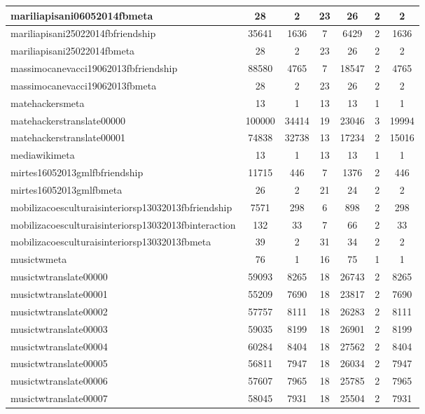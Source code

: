 \begin{table*}[h!]
\begin{center}
\begin{tabular}{| l | c | c | c | c | c | c |}
mariliapisani06052014fbmeta & 28  & 2  & 23  & 26  & 2  & 2 \\\hline
mariliapisani25022014fbfriendship & 35641  & 1636  & 7  & 6429  & 2  & 1636 \\\hline
mariliapisani25022014fbmeta & 28  & 2  & 23  & 26  & 2  & 2 \\\hline
massimocanevacci19062013fbfriendship & 88580  & 4765  & 7  & 18547  & 2  & 4765 \\\hline
massimocanevacci19062013fbmeta & 28  & 2  & 23  & 26  & 2  & 2 \\\hline
matehackersmeta & 13  & 1  & 13  & 13  & 1  & 1 \\\hline
matehackerstranslate00000 & 100000  & 34414  & 19  & 23046  & 3  & 19994 \\\hline
matehackerstranslate00001 & 74838  & 32738  & 13  & 17234  & 2  & 15016 \\\hline
mediawikimeta & 13  & 1  & 13  & 13  & 1  & 1 \\\hline
mirtes16052013gmlfbfriendship & 11715  & 446  & 7  & 1376  & 2  & 446 \\\hline
mirtes16052013gmlfbmeta & 26  & 2  & 21  & 24  & 2  & 2 \\\hline
mobilizacoesculturaisinteriorsp13032013fbfriendship & 7571  & 298  & 6  & 898  & 2  & 298 \\\hline
mobilizacoesculturaisinteriorsp13032013fbinteraction & 132  & 33  & 7  & 66  & 2  & 33 \\\hline
mobilizacoesculturaisinteriorsp13032013fbmeta & 39  & 2  & 31  & 34  & 2  & 2 \\\hline
musictwmeta & 76  & 1  & 16  & 75  & 1  & 1 \\\hline
musictwtranslate00000 & 59093  & 8265  & 18  & 26743  & 2  & 8265 \\\hline
musictwtranslate00001 & 55209  & 7690  & 18  & 23817  & 2  & 7690 \\\hline
musictwtranslate00002 & 57757  & 8111  & 18  & 26283  & 2  & 8111 \\\hline
musictwtranslate00003 & 59035  & 8199  & 18  & 26901  & 2  & 8199 \\\hline
musictwtranslate00004 & 60284  & 8404  & 18  & 27562  & 2  & 8404 \\\hline
musictwtranslate00005 & 56811  & 7947  & 18  & 26034  & 2  & 7947 \\\hline
musictwtranslate00006 & 57607  & 7965  & 18  & 25785  & 2  & 7965 \\\hline
musictwtranslate00007 & 58045  & 7931  & 18  & 25504  & 2  & 7931 \\\hline

\end{tabular}
\end{center}
\end{table*}
